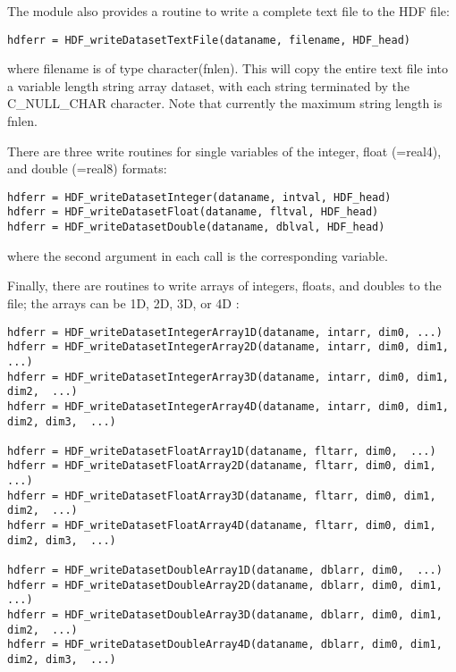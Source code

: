 \documentclass[DIV=calc, paper=letter, fontsize=11pt]{scrartcl}	 %
\begin{document}
The module also provides a routine to write a complete text file to the HDF file:
\begin{verbatim}
hdferr = HDF_writeDatasetTextFile(dataname, filename, HDF_head)
\end{verbatim}
where \textsf{filename} is of type \textsf{character(fnlen)}.  This will copy the entire text file 
into a variable length string array dataset, with each string terminated by the \textsf{C\_NULL\_CHAR}
character.  Note that currently the maximum string length is \textsf{fnlen}.

There are three write routines for single variables of the \textsf{integer}, \textsf{float} (=real4),
and \textsf{double} (=real8) formats:
\begin{verbatim}
hdferr = HDF_writeDatasetInteger(dataname, intval, HDF_head)
hdferr = HDF_writeDatasetFloat(dataname, fltval, HDF_head)
hdferr = HDF_writeDatasetDouble(dataname, dblval, HDF_head)
\end{verbatim}
where the second argument in each call is the corresponding variable.

Finally, there are routines to write arrays of integers, floats, and doubles to the file; the arrays
can be 1D, 2D, 3D, or 4D :
\begin{verbatim}
hdferr = HDF_writeDatasetIntegerArray1D(dataname, intarr, dim0, ...)
hdferr = HDF_writeDatasetIntegerArray2D(dataname, intarr, dim0, dim1,  ...)
hdferr = HDF_writeDatasetIntegerArray3D(dataname, intarr, dim0, dim1, dim2,  ...)
hdferr = HDF_writeDatasetIntegerArray4D(dataname, intarr, dim0, dim1, dim2, dim3,  ...)

hdferr = HDF_writeDatasetFloatArray1D(dataname, fltarr, dim0,  ...)
hdferr = HDF_writeDatasetFloatArray2D(dataname, fltarr, dim0, dim1,  ...)
hdferr = HDF_writeDatasetFloatArray3D(dataname, fltarr, dim0, dim1, dim2,  ...)
hdferr = HDF_writeDatasetFloatArray4D(dataname, fltarr, dim0, dim1, dim2, dim3,  ...)

hdferr = HDF_writeDatasetDoubleArray1D(dataname, dblarr, dim0,  ...)
hdferr = HDF_writeDatasetDoubleArray2D(dataname, dblarr, dim0, dim1,  ...)
hdferr = HDF_writeDatasetDoubleArray3D(dataname, dblarr, dim0, dim1, dim2,  ...)
hdferr = HDF_writeDatasetDoubleArray4D(dataname, dblarr, dim0, dim1, dim2, dim3,  ...)
\end{verbatim}
\end{document}
